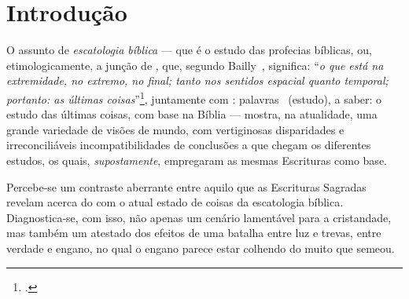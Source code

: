 \setlength{\parskip}{0.5\baselineskip}



\section{Introdução}

    O assunto de \emph{escatologia bíblica} --- que é o estudo  das  profecias  bíblicas,  ou,  etimologicamente,  a  junção  de
    ,  que,  segundo  Bailly~\cite[pp.~817-8]{2000-BaillyA-Hachette},  significa:   ``\textit{o   que   está   na
    extremidade,  no  extremo,   no   final;   tanto   nos   sentidos   espacial   quanto   temporal;   portanto:   as   últimas
    coisas\/}''\footnote{.},
    juntamente com : palavras~\cite{1997-ManiatoglouMPF-Porto} (estudo), a saber: o estudo das últimas coisas, com
    base na Bíblia --- mostra, na atualidade, uma  grande  variedade  de  visões  de  mundo,  com  vertiginosas  disparidades  e
    irreconciliáveis incompatibilidades de conclusões a  que  chegam  os  diferentes  estudos,  os  quais,  \emph{supostamente},
    empregaram as mesmas Escrituras como base.

    Percebe-se um contraste aberrante entre  aquilo  que  as  Escrituras  Sagradas  revelam  acerca  do   com o atual estado de coisas da escatologia bíblica. Di\-a\-gnos\-ti\-ca-se, com isso, não  apenas
    um cenário lamentável para a cristandade, mas também um atestado dos efeitos de  uma  batalha  entre  luz  e  trevas,  entre
    verdade e engano, no qual o engano parece estar colhendo do muito que semeou.

